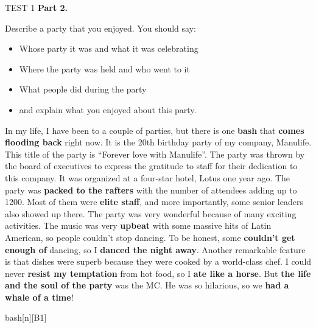 \begin{glossarymc}[Cambridge 7]
\begin{test}{TEST 1}
    \noindent
    \textbf{Part 2.}
    \begin{qa}{Describe a party that you enjoyed. You should say:}
    \begin{itemize}

    \item Whose party it was and what it was celebrating
    \item Where the party was held and who went to it
    \item What people did during the party
    \item and explain what you enjoyed about this party.
    \end{itemize}

    In my life, I have been to a couple of parties, but there is one \textbf{bash} that \textbf{comes flooding back} right now. It is the 20th birthday party of my company, Manulife. This title of the party is “Forever love with Manulife”. The party was thrown by the board of executives to express the gratitude to staff for their dedication to this company. It was organized at a four-star hotel, Lotus one year ago. The party was \textbf{packed to the rafters} with the number of attendees adding up to 1200. Most of them were \textbf{elite staff}, and more importantly, some senior leaders also showed up there. The party was very wonderful because of many exciting activities. The music was very \textbf{upbeat} with some massive hits of Latin American, so people couldn’t stop dancing. To be honest, some \textbf{couldn't get enough of} dancing, so I \textbf{danced the night away}. Another remarkable feature is that dishes were superb because they were cooked by a world-class chef. I could never \textbf{resist my temptation} from hot food, so I \textbf{ate like a horse}. But \textbf{the life and the soul of the party} was the MC. He was so hilarious, so we \textbf{had a whale of a time}!
    \end{qa}

        \begin{VocabExplain}[Part 2]
            \begin{ExplainCard}{bash}[n][B1]
            \end{ExplainCard}


\end{VocabExplain}
\end{test}
\end{glossarymc}
